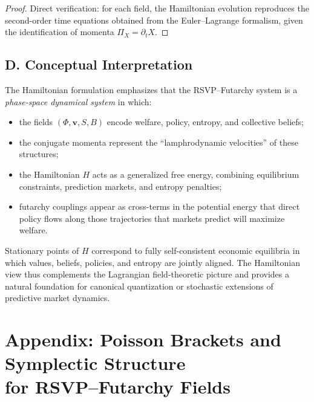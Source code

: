 \documentclass[12pt]{article}
\begin{document}
\begin{proof}
Direct verification: for each field, the Hamiltonian evolution
reproduces the second-order time equations obtained from the
Euler--Lagrange formalism, given the identification of momenta
$\Pi_X = \partial_t X$.
\end{proof}

\subsection*{D. Conceptual Interpretation}

The Hamiltonian formulation emphasizes that the RSVP--Futarchy system
is a \emph{phase-space dynamical system} in which:
\begin{itemize}
    \item the fields $(\Phi,\mathbf{v},S,B)$ encode welfare, policy,
    entropy, and collective beliefs;
    \item the conjugate momenta represent the ``lamphrodynamic
    velocities'' of these structures;
    \item the Hamiltonian $H$ acts as a generalized free energy,
    combining equilibrium constraints, prediction markets, and
    entropy penalties;
    \item futarchy couplings appear as cross-terms in the potential
    energy that direct policy flows along those trajectories that
    markets predict will maximize welfare.
\end{itemize}

Stationary points of $H$ correspond to fully self-consistent economic
equilibria in which values, beliefs, policies, and entropy are jointly
aligned. The Hamiltonian view thus complements the Lagrangian
field-theoretic picture and provides a natural foundation for canonical
quantization or stochastic extensions of predictive market dynamics.


\section*{Appendix: Poisson Brackets and Symplectic Structure\\
for RSVP--Futarchy Fields}
\end{document}
